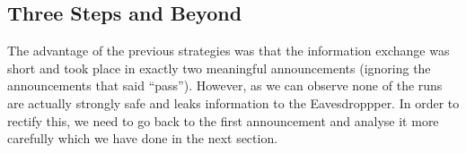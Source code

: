 \subsection{Three Steps and Beyond}

The advantage of the previous strategies was that the information
exchange was short and took place in exactly two meaningful announcements
(ignoring the announcements that said ``pass''). However, as we can observe
none of the runs are actually strongly safe and leaks information
to the Eavesdroppper. In order to rectify this, we need
to go back to the first announcement and analyse it more carefully
which we have done in the next section.
